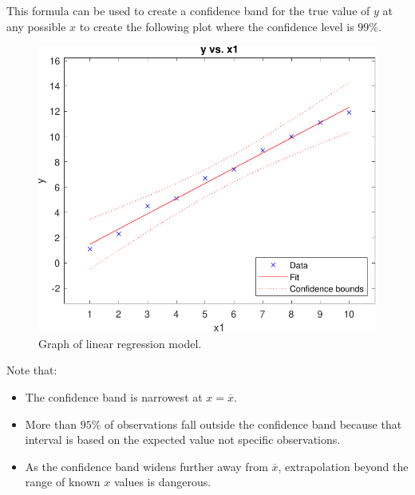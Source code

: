 \documentclass{article}
\begin{document}
This formula can be used to create a confidence band for the true value of
\(y\) at any possible \(x\) to create the following plot where the confidence level is \(99\% \).
\begin{figure}[H]
    \centering
    \includegraphics[width = \linewidth, keepaspectratio = true]{figures/linear_regression.pdf}
    \caption{Graph of linear regression model.}
\end{figure}
Note that:
\begin{itemize}
    \item The confidence band is narrowest at \(x = \overline{x}\).
    \item More than \(95\%\) of observations fall outside the confidence band because that interval is based on the expected value not specific observations.
    \item As the confidence band widens further away from \(\overline{x}\), extrapolation beyond the range of known \(x\) values is dangerous.
\end{itemize}
\end{document}
